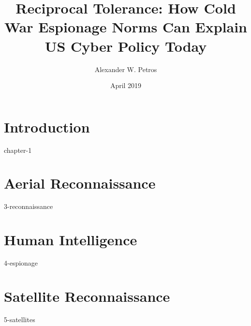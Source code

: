 \documentclass{report}
\title{Reciprocal Tolerance: How Cold War Espionage Norms Can Explain US Cyber Policy Today}
\author{Alexander W. Petros}
\date{April 2019}
\begin{document}
    \maketitle
    \tableofcontents
    \newpage

    \chapter{Introduction}
    {chapter-1}

    \chapter{Aerial Reconnaissance}
    {3-reconnaissance}

    \chapter{Human Intelligence}
    {4-espionage}

    \chapter{Satellite Reconnaissance}
    {5-satellites}
\end{document}
